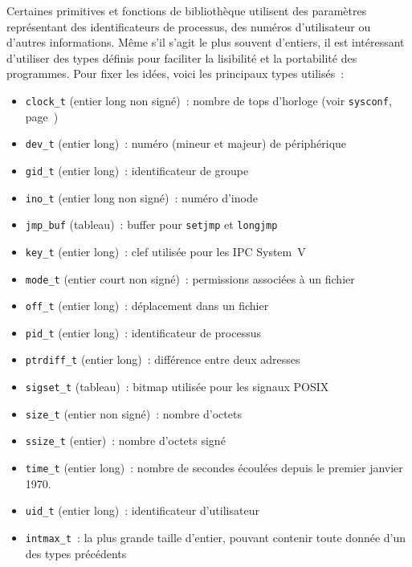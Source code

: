 \documentclass [twoside] {report}
\begin{document}
Certaines primitives et fonctions de bibliothèque utilisent des paramètres
représentant des identificateurs de processus, des numéros d'utilisateur
ou d'autres informations.  Même s'il s'agit le plus souvent d'entiers,
il est intéressant d'utiliser des types définis pour faciliter la
lisibilité et la portabilité des programmes. Pour fixer les idées, voici
les principaux types utilisés~:

\begin {itemize}
    \item \texttt {clock\_t} (entier long non signé)~: nombre de tops
	d'horloge (voir \texttt {sysconf}, page~\pageref {sysconf})
    \item \texttt {dev\_t} (entier long)~: numéro (mineur et majeur) de
	périphérique
    \item \texttt {gid\_t} (entier long)~: identificateur de groupe
    \item \texttt {ino\_t} (entier long non signé)~: numéro d'inode
    \item \texttt {jmp\_buf} (tableau)~: buffer pour \texttt {setjmp} et
	\texttt {longjmp}
    \item \texttt {key\_t} (entier long)~: clef utilisée pour les IPC System~V
    \item \texttt {mode\_t} (entier court non signé)~: permissions associées
	à un fichier
    \item \texttt {off\_t} (entier long)~: déplacement dans un fichier
    \item \texttt {pid\_t} (entier long)~: identificateur de processus
    \item \texttt {ptrdiff\_t} (entier long)~: différence entre deux adresses
    \item \texttt {sigset\_t} (tableau)~: bitmap utilisée pour les signaux POSIX
    \item \texttt {size\_t} (entier non signé)~: nombre d'octets
    \item \texttt {ssize\_t} (entier)~: nombre d'octets signé
    \item \texttt {time\_t} (entier long)~: nombre de secondes écoulées
	depuis le premier janvier 1970.
    \item \texttt {uid\_t} (entier long)~: identificateur d'utilisateur
    \item \texttt {intmax\_t}~: la plus grande taille d'entier,
	pouvant contenir toute donnée d'un des types précédents

\end {itemize}
\end{document}
